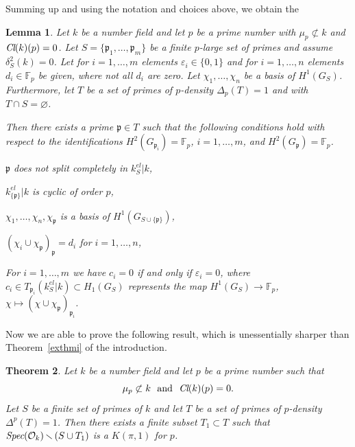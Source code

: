 \documentclass[10pt]{article}
\newcommand{\Spec}{\text{\it Spec}}
\newcommand{\F}{{\mathbb F}}
\renewcommand{\O}{{\mathcal{O}}}
\newcommand{\Cl}{\text{\it Cl}}
\newcommand{\p}{{\mathfrak p}}
\newcommand{\sm}{{\,\smallsetminus\,}}
\theoremstyle{alex}
\newtheorem{theorem}{Theorem}[section]
\newtheorem{lemma}[theorem]{Lemma}
\theoremstyle{alexdef}
\begin{document}
\medskip
Summing up and using the notation and choices above, we obtain the
\begin{lemma} \label{search}
Let $k$ be a number field and let $p$ be a prime number with $\mu_p\not\subset k$ and $\Cl(k)(p)=0$. Let $S=\{\p_1,\ldots, \p_m\}$ be a finite $p$-large set of primes and assume $\delta^2_S(k)=0$. Let for $i=1,\ldots,m$ elements $\varepsilon_i\in \{0,1\}$ and for $i=1,\ldots,n$ elements $d_i \in \F_p$ be given, where not all $d_i$ are zero. Let $\chi_1,\ldots,\chi_n$ be a basis of $H^1(G_S)$. Furthermore, let $T$ be a set of primes of $p$-density $\varDelta_p(T)=1$ and with $T\cap S=\varnothing$.

Then there exists a prime $\p\in T$  such that the following conditions hold with respect to the identifications $H^2(G_{\p_i})=\F_p$,  $i=1,\ldots,m$,  and $H^2(G_\p)=\F_p$.

\medskip\noindent
\begin{compactitem}
\item $\p$ does not split completely in $k_S^{el}|k$,
\item $k_{\{\p\}}^{el}|k$ is cyclic of order $p$,
\item $\chi_1,\ldots, \chi_n,\chi_\p$ is a basis of $H^1(G_{S\cup\{\p\}})$,
\item $(\chi_i \cup \chi_\p)_\p=d_i$ for  $i=1,\ldots,n$,
\item For  $i=1,\ldots,m$ we have $c_i=0$ if and only if  $\varepsilon_i=0$, where $c_i\in T_{\p_i}(k_S^{el}|k)\subset H_1(G_S)$ represents the map $H^1(G_S) \to \F_p$, $\chi \mapsto (\chi \cup \chi_\p)_{\p_i}$.
\end{compactitem}

\end{lemma}


Now we are able to prove the following result, which is unessentially sharper than Theorem~\ref{exthmi} of the introduction.


\begin{theorem}\label{existenceofkpi1}
Let $k$ be a number field and let $p$ be a prime number such that
\[
\mu_p\not\subset k\ \text{ and }\ \Cl(k)(p)=0.
\]
Let $S$ be a finite set of primes of\/ $k$ and let $T$ be a set of primes of $p$-density $\varDelta^p(T)=1$. Then there exists a finite subset $T_1\subset T$ such that $\Spec(\O_k)\sm (S\cup T_1)$ is a $K(\pi,1)$ for\/ $p$.
\end{theorem}
\end{document}
